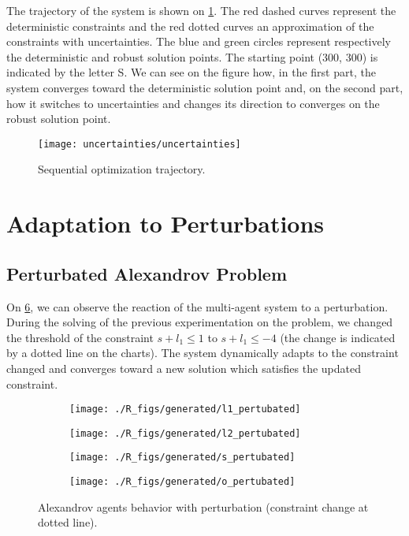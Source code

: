 The trajectory of the system is shown on \figurename{} \ref{sequential_optim_fig}. The red dashed curves represent the deterministic constraints and the red dotted curves an approximation of the constraints with uncertainties. The blue and green circles represent respectively the deterministic and robust solution points. The starting point (300, 300) is indicated by the letter S. We can see on the figure how, in the first part, the system converges toward the deterministic solution point and, on the second part, how it switches to uncertainties and changes its direction to converges on the robust solution point.

\begin{figure}
\centering
\texttt{[image: uncertainties/uncertainties]}
\caption{Sequential optimization trajectory.}\label{sequential_optim_fig}
\end{figure}

\section{Adaptation to Perturbations}

\subsection{Perturbated Alexandrov Problem}
 
On \figurename{} \ref{alexandrov_res_pert}, we can observe the reaction of the multi-agent system to a perturbation. During the solving of the previous experimentation on the problem, we changed the threshold of the constraint $s + l_1 \leq 1$ to $s + l_1 \leq -4$ (the change is indicated by a dotted line on the charts). The system dynamically adapts to the constraint changed and converges toward a new solution which satisfies the updated constraint.

\begin{figure}[]
\centering
	\begin{subfigure}[b]{0.4\textwidth}
		\centering
		\texttt{[image: ./R\_figs/generated/l1\_pertubated]}
		\label{alexandrov_res_pert:l1}
	\end{subfigure}
	\begin{subfigure}[b]{0.4\textwidth}
		\centering
		\texttt{[image: ./R\_figs/generated/l2\_pertubated]}
		\label{alexandrov_res_pert:l2}
	\end{subfigure}

	\begin{subfigure}[b]{0.4\textwidth}
		\centering
		\texttt{[image: ./R\_figs/generated/s\_pertubated]}
		\label{alexandrov_res_pert:s}
	\end{subfigure}
	\begin{subfigure}[b]{0.4\textwidth}
		\centering
		\texttt{[image: ./R\_figs/generated/o\_pertubated]}
		\label{alexandrov_res_pert:o}
	\end{subfigure}
	
	\caption{Alexandrov agents behavior with perturbation (constraint change at dotted line).}
	\label{alexandrov_res_pert}
	
\end{figure}

